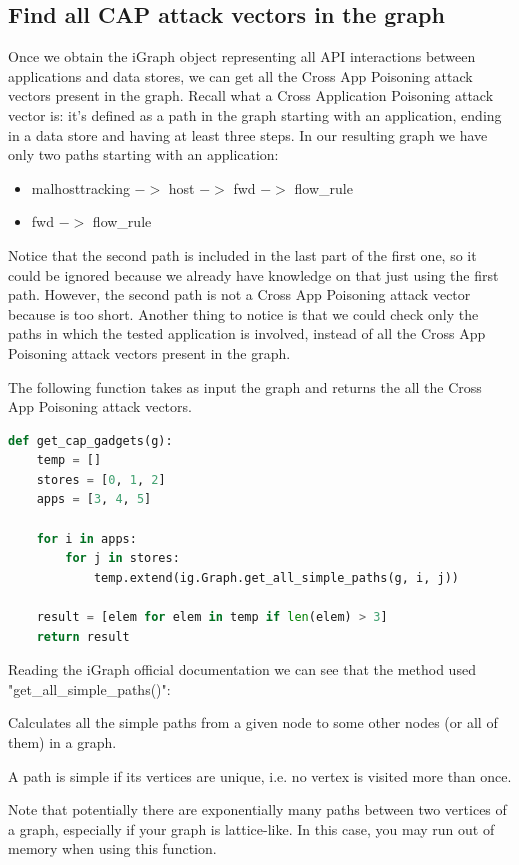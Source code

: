 \subsection{Find all CAP attack vectors in the graph}
Once we obtain the iGraph object representing all API interactions between applications and data stores, we can get all the Cross App Poisoning attack vectors present in the graph. Recall what a Cross Application Poisoning attack vector is: it's defined as a path in the graph starting with an application, ending in a data store and having at least three steps. In our resulting graph we have only two paths starting with an application:
\begin{itemize}
    \item malhosttracking $->$ host $->$ fwd $->$ flow\_rule
    \item fwd $->$ flow\_rule
\end{itemize}

Notice that the second path is included in the last part of the first one, so it could be ignored because we already have knowledge on that just using the first path. However, the second path is not a Cross App Poisoning attack vector because is too short. Another thing to notice is that we could check only the paths in which the tested application is involved, instead of all the Cross App Poisoning attack vectors present in the graph.

The following function takes as input the graph and returns the all the Cross App Poisoning attack vectors.
\begin{lstlisting}[language=python,firstnumber=113]
def get_cap_gadgets(g):
    temp = []
    stores = [0, 1, 2]
    apps = [3, 4, 5]

    for i in apps:
        for j in stores:
            temp.extend(ig.Graph.get_all_simple_paths(g, i, j))

    result = [elem for elem in temp if len(elem) > 3]
    return result
\end{lstlisting}

Reading the iGraph official documentation \cite{igraph-api} we can see that the method used\\ "get\_all\_simple\_paths()":
\begin{quoting}[font=itshape, begintext={"}, endtext={"}]
Calculates all the simple paths from a given node to some other nodes (or all of them) in a graph.

A path is simple if its vertices are unique, i.e. no vertex is visited more than once.

Note that potentially there are exponentially many paths between two vertices of a graph, especially if your graph is lattice-like. In this case, you may run out of memory when using this function.
\end{quoting}

